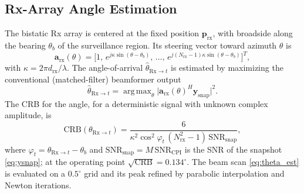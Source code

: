 \documentclass[journal]{IEEEtran}
\DeclareMathOperator*{\argmax}{arg\,max}
\begin{document}
\subsection{Rx-Array Angle Estimation}
The bistatic Rx array is centered at the fixed position
$\bm{p}_{\mathrm{rx}}$, with broadside along the bearing $\theta_b$ of the surveillance region. Its steering vector toward azimuth $\theta$ is
\begin{equation}
\bm{a}_{\mathrm{rx}}(\theta) =
\big[1,\, e^{j\kappa\sin(\theta-\theta_b)},\,\dots,\,
e^{j(N_{\mathrm{rx}}-1)\kappa\sin(\theta-\theta_b)}\big]^T,
\label{eq:arx}
\end{equation}
with $\kappa = 2\pi d_{\mathrm{rx}}/\lambda$.
The angle-of-arrival $\hat{\theta}_{\mathrm{Rx}\to t}$ is estimated by
maximizing the conventional (matched-filter) beamformer
output~\cite{van2002optimum, krim2002two}
\begin{equation}
\hat{\theta}_{\mathrm{Rx}\to t} =
\argmax_\theta \big|\bm{a}_{\mathrm{rx}}(\theta)^H
\bm{y}_{\mathrm{snap}}\big|^2.
\label{eq:theta_est}
\end{equation}
The CRB for the angle, for a deterministic signal with unknown complex amplitude, is~\cite{van2002optimum, steven1993fundamentals}
\begin{equation}
\mathrm{CRB}(\theta_{\mathrm{Rx}\to t}) =
\frac{6}{\kappa^2\cos^2\!\varphi_t\,(N_{\mathrm{rx}}^2-1)\,\mathrm{SNR}_{\mathrm{snap}}},
\label{eq:crb_theta}
\end{equation}
where $\varphi_t = \theta_{\mathrm{Rx}\to t}-\theta_b$ and $\mathrm{SNR}_{\mathrm{snap}} = M\,\mathrm{SNR}_{\mathrm{CPI}}$ is the SNR of the snapshot \eqref{eq:ysnap}; at the operating point $\sqrt{\mathrm{CRB}} = 0.134^\circ$. The beam scan \eqref{eq:theta_est} is evaluated on a $0.5^\circ$ grid and its peak refined by parabolic interpolation and Newton iterations.
\end{document}
